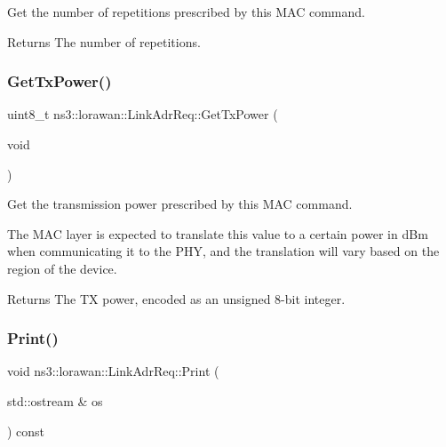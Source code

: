 Get the number of repetitions prescribed by this M\+AC command.

\begin{DoxyReturn}{Returns}
The number of repetitions. 
\end{DoxyReturn}
\mbox{\label{classns3_1_1lorawan_1_1LinkAdrReq_a723eef40c7a4bba6f48d7ad61c2b9c12}} 
\subsubsection{\texorpdfstring{Get\+Tx\+Power()}{GetTxPower()}}
{\footnotesize\ttfamily uint8\+\_\+t ns3\+::lorawan\+::\+Link\+Adr\+Req\+::\+Get\+Tx\+Power (\begin{DoxyParamCaption}\item[{void}]{ }\end{DoxyParamCaption})}

Get the transmission power prescribed by this M\+AC command.

The M\+AC layer is expected to translate this value to a certain power in d\+Bm when communicating it to the P\+HY, and the translation will vary based on the region of the device.

\begin{DoxyReturn}{Returns}
The TX power, encoded as an unsigned 8-\/bit integer. 
\end{DoxyReturn}
\mbox{\label{classns3_1_1lorawan_1_1LinkAdrReq_aa6f8732a740ae000006f56fd605cfaf4}} 
\subsubsection{\texorpdfstring{Print()}{Print()}}
{\footnotesize\ttfamily void ns3\+::lorawan\+::\+Link\+Adr\+Req\+::\+Print (\begin{DoxyParamCaption}\item[{std\+::ostream \&}]{os }\end{DoxyParamCaption}) const\hspace{0.3cm}{\ttfamily [virtual]}}

